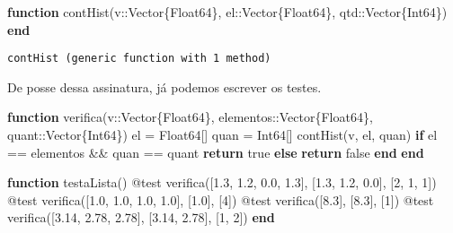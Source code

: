 \documentclass[
  letterpaper,
  DIV=11,
  numbers=noendperiod]{scrreprt}
\newenvironment{Shaded}{\begin{snugshade}}{\end{snugshade}}
\newcommand{\ConstantTok}[1]{\textcolor[rgb]{0.56,0.35,0.01}{#1}}
\newcommand{\ControlFlowTok}[1]{\textcolor[rgb]{0.00,0.23,0.31}{\textbf{#1}}}
\newcommand{\DataTypeTok}[1]{\textcolor[rgb]{0.68,0.00,0.00}{#1}}
\newcommand{\FloatTok}[1]{\textcolor[rgb]{0.68,0.00,0.00}{#1}}
\newcommand{\FunctionTok}[1]{\textcolor[rgb]{0.28,0.35,0.67}{#1}}
\newcommand{\KeywordTok}[1]{\textcolor[rgb]{0.00,0.23,0.31}{\textbf{#1}}}
\newcommand{\NormalTok}[1]{\textcolor[rgb]{0.00,0.23,0.31}{#1}}
\newcommand{\OperatorTok}[1]{\textcolor[rgb]{0.37,0.37,0.37}{#1}}
\newcommand{\PreprocessorTok}[1]{\textcolor[rgb]{0.68,0.00,0.00}{#1}}
\begin{document}
\begin{Shaded}
\begin{Highlighting}[]
\KeywordTok{function} \FunctionTok{contHist}\NormalTok{(v}\OperatorTok{::}\DataTypeTok{Vector\{Float64\}}\NormalTok{, el}\OperatorTok{::}\DataTypeTok{Vector\{Float64\}}\NormalTok{, qtd}\OperatorTok{::}\DataTypeTok{Vector\{Int64\}}\NormalTok{)}
\KeywordTok{end}
\end{Highlighting}
\end{Shaded}

\begin{verbatim}
contHist (generic function with 1 method)
\end{verbatim}

De posse dessa assinatura, já podemos escrever os testes.

\begin{Shaded}
\begin{Highlighting}[]
\KeywordTok{function} \FunctionTok{verifica}\NormalTok{(v}\OperatorTok{::}\DataTypeTok{Vector\{Float64\}}\NormalTok{, elementos}\OperatorTok{::}\DataTypeTok{Vector\{Float64\}}\NormalTok{, }
\NormalTok{     quant}\OperatorTok{::}\DataTypeTok{Vector\{Int64\}}\NormalTok{)}
\NormalTok{     el }\OperatorTok{=} \DataTypeTok{Float64}\NormalTok{[]}
\NormalTok{     quan }\OperatorTok{=} \DataTypeTok{Int64}\NormalTok{[]}
     \FunctionTok{contHist}\NormalTok{(v, el, quan)}
     \ControlFlowTok{if}\NormalTok{ el }\OperatorTok{==}\NormalTok{ elementos }\OperatorTok{\&\&}\NormalTok{ quan }\OperatorTok{==}\NormalTok{ quant}
        \ControlFlowTok{return} \ConstantTok{true}
     \ControlFlowTok{else}
        \ControlFlowTok{return} \ConstantTok{false}
     \ControlFlowTok{end}
\KeywordTok{end}

\KeywordTok{function} \FunctionTok{testaLista}\NormalTok{()}
  \PreprocessorTok{@test} \FunctionTok{verifica}\NormalTok{([}\FloatTok{1.3}\NormalTok{, }\FloatTok{1.2}\NormalTok{, }\FloatTok{0.0}\NormalTok{, }\FloatTok{1.3}\NormalTok{], [}\FloatTok{1.3}\NormalTok{, }\FloatTok{1.2}\NormalTok{, }\FloatTok{0.0}\NormalTok{], [}\FloatTok{2}\NormalTok{, }\FloatTok{1}\NormalTok{, }\FloatTok{1}\NormalTok{])}
  \PreprocessorTok{@test} \FunctionTok{verifica}\NormalTok{([}\FloatTok{1.0}\NormalTok{, }\FloatTok{1.0}\NormalTok{, }\FloatTok{1.0}\NormalTok{, }\FloatTok{1.0}\NormalTok{], [}\FloatTok{1.0}\NormalTok{], [}\FloatTok{4}\NormalTok{])}
  \PreprocessorTok{@test} \FunctionTok{verifica}\NormalTok{([}\FloatTok{8.3}\NormalTok{], [}\FloatTok{8.3}\NormalTok{], [}\FloatTok{1}\NormalTok{])}
  \PreprocessorTok{@test} \FunctionTok{verifica}\NormalTok{([}\FloatTok{3.14}\NormalTok{, }\FloatTok{2.78}\NormalTok{, }\FloatTok{2.78}\NormalTok{], [}\FloatTok{3.14}\NormalTok{, }\FloatTok{2.78}\NormalTok{], [}\FloatTok{1}\NormalTok{, }\FloatTok{2}\NormalTok{])}
\KeywordTok{end}
\end{Highlighting}
\end{Shaded}
\end{document}
